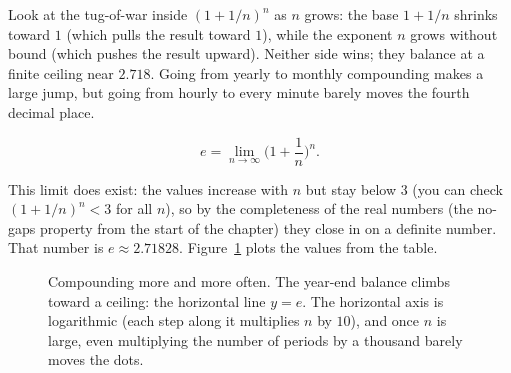 \begin{intuitionbox}
Look at the tug-of-war inside $(1+1/n)^n$ as $n$ grows: the base $1+1/n$ shrinks toward $1$ (which pulls the result toward $1$), while the exponent $n$ grows without bound (which pushes the result upward). Neither side wins; they balance at a finite ceiling near $2.718$. Going from yearly to monthly compounding makes a large jump, but going from hourly to every minute barely moves the fourth decimal place.
\end{intuitionbox}

\begin{definition}\label{ch03:def-e-limit}
\[
e = \lim_{n\to\infty}\Big(1+\frac1n\Big)^{n}.
\]
\end{definition}

This limit does exist: the values increase with $n$ but stay below $3$ (you can check $(1+1/n)^n < 3$ for all $n$), so by the completeness of the real numbers (the no-gaps property from the start of the chapter) they close in on a definite number. That number is $e \approx 2.71828$. Figure~\ref{ch03:fig-compound} plots the values from the table.

\begin{figure}[htbp]
\centering
{}
\caption{Compounding more and more often. The year-end balance climbs toward a ceiling: the horizontal line $y=e$. The horizontal axis is logarithmic (each step along it multiplies $n$ by $10$), and once $n$ is large, even multiplying the number of periods by a thousand barely moves the dots.}
\label{ch03:fig-compound}
\end{figure}

